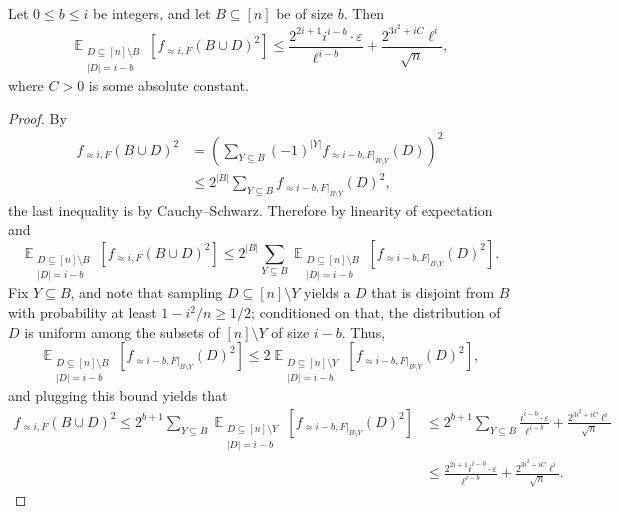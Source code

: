 \documentclass{toc}
\newcommand\card[1]{\left| {#1} \right|}
\newcommand\Expect[2]{{\mathop{\mathbb{E}}_{#1}\left[ {#2} \right]}}
\newcommand\eps{\varepsilon}
\renewcommand\geq{\geqslant}
\renewcommand\leq{\leqslant}
\newcommand\approxlvlfn[2]{{#1}_{\approx{#2}}}
\begin{document}
\begin{corollary}\label{corr:rest_norm}
Let $0\leq b\leq i$ be integers, and let $B\subseteq [n]$ be of size $b$. Then
\[
\Expect{\substack{D\subseteq [n]\setminus B \\ \card{D} = i-b}}{\approxlvlfn{f}{i, F}(B\cup D)^2}
\leq \frac{2^{2i+1}i^{i-b}\cdot \eps }{\ell^{i-b}}
+\frac{2^{3i^2+iC} \ell^{i}}{\sqrt{n}},
\]
where $C>0$ is some absolute constant.
\end{corollary}
\begin{proof}
By 
\begin{align*}
\approxlvlfn{f}{i, F}(B\cup D)^2
&=\left(\sum\limits_{Y\subseteq B}{(-1)^{\card{Y}} \approxlvlfn{f}{i-b, F|_{B\setminus Y}}(D)}\right)^2\\
&\leq 2^{\card{B}} \sum\limits_{Y\subseteq B}{\approxlvlfn{f}{i-b, F|_{B\setminus Y}}(D)^2},
\end{align*}
the last inequality is by Cauchy--Schwarz. Therefore by linearity of expectation and 
\[
\Expect{\substack{D\subseteq [n]\setminus B \\ \card{D} = i-b}}{\approxlvlfn{f}{i, F}(B\cup D)^2}
\leq
2^{\card{B}}
\sum\limits_{Y\subseteq B}{
\Expect{\substack{D\subseteq [n]\setminus B \\ \card{D} = i-b}}{\approxlvlfn{f}{i-b, F|_{B\setminus Y}}(D)^2}}.
\]
Fix $Y\subseteq B$, and note that sampling $D\subseteq [n]\setminus Y$ yields a $D$ that is disjoint from $B$
with probability at least $1- i^2/n \geq 1/2$; conditioned on that, the distribution of $D$ is uniform among
the subsets of $[n]\setminus Y$ of size $i-b$. Thus,
\[
\Expect{\substack{D\subseteq [n]\setminus B \\ \card{D} = i-b}}{\approxlvlfn{f}{i-b, F|_{B\setminus Y}}(D)^2}
\leq
2
\Expect{\substack{D\subseteq [n]\setminus Y \\ \card{D} = i-b}}{\approxlvlfn{f}{i-b, F|_{B\setminus Y}}(D)^2},
\]
and plugging this bound yields that
\begin{align*}
\approxlvlfn{f}{i, F}(B\cup D)^2
\leq
2^{b+1}
\sum\limits_{Y\subseteq B}{
\Expect{\substack{D\subseteq [n]\setminus Y \\ \card{D} = i-b}}{\approxlvlfn{f}{i-b, F|_{B\setminus Y}}(D)^2}}
&\leq 2^{b+1}
\sum\limits_{Y\subseteq B}
\frac{i^{i-b}\cdot \eps }{\ell^{i-b}} + \frac{2^{3i^2+iC} \ell^{i}}{\sqrt{n}}\\
&\leq \frac{2^{2i+1}i^{i-b}\cdot\eps }{\ell^{i-b}}
+\frac{2^{3i^2+iC} \ell^{i}}{\sqrt{n}}.
\end{align*}
\end{proof}
\end{document}
